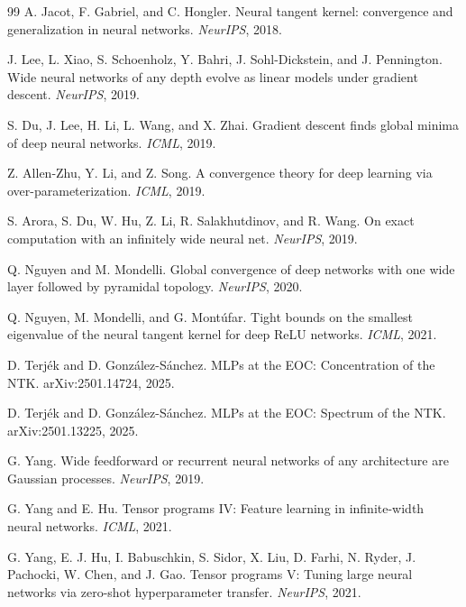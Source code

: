 \documentclass{article}
\begin{document}
\clearpage
\begin{thebibliography}{99}
A. Jacot, F. Gabriel, and C. Hongler.
\newblock Neural tangent kernel: convergence and generalization in neural networks.
\newblock \emph{NeurIPS}, 2018.

J. Lee, L. Xiao, S. Schoenholz, Y. Bahri, J. Sohl-Dickstein, and J. Pennington.
\newblock Wide neural networks of any depth evolve as linear models under gradient descent.
\newblock \emph{NeurIPS}, 2019.

S. Du, J. Lee, H. Li, L. Wang, and X. Zhai.
\newblock Gradient descent finds global minima of deep neural networks.
\newblock \emph{ICML}, 2019.

Z. Allen-Zhu, Y. Li, and Z. Song.
\newblock A convergence theory for deep learning via over-parameterization.
\newblock \emph{ICML}, 2019.

S. Arora, S. Du, W. Hu, Z. Li, R. Salakhutdinov, and R. Wang.
\newblock On exact computation with an infinitely wide neural net.
\newblock \emph{NeurIPS}, 2019.

Q. Nguyen and M. Mondelli.
\newblock Global convergence of deep networks with one wide layer followed by pyramidal topology.
\newblock \emph{NeurIPS}, 2020.

Q. Nguyen, M. Mondelli, and G. Montúfar.
\newblock Tight bounds on the smallest eigenvalue of the neural tangent kernel for deep ReLU networks.
\newblock \emph{ICML}, 2021.

D. Terjék and D. González-Sánchez.
\newblock MLPs at the EOC: Concentration of the NTK.
\newblock arXiv:2501.14724, 2025.

D. Terjék and D. González-Sánchez.
\newblock MLPs at the EOC: Spectrum of the NTK.
\newblock arXiv:2501.13225, 2025.

G. Yang.
\newblock Wide feedforward or recurrent neural networks of any architecture are Gaussian processes.
\newblock \emph{NeurIPS}, 2019.

G. Yang and E. Hu.
\newblock Tensor programs IV: Feature learning in infinite-width neural networks.
\newblock \emph{ICML}, 2021.

G. Yang, E. J. Hu, I. Babuschkin, S. Sidor, X. Liu, D. Farhi, N. Ryder, J. Pachocki, W. Chen, and J. Gao.
\newblock Tensor programs V: Tuning large neural networks via zero-shot hyperparameter transfer.
\newblock \emph{NeurIPS}, 2021.


\end{thebibliography}
\end{document}
